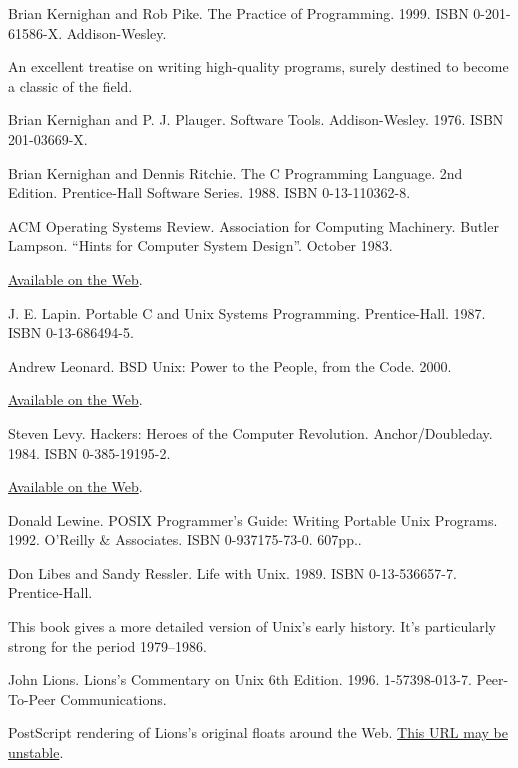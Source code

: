 \documentclass[12pt,oneside]{book}
\begin{document}
\begin{common-format}
\begin{thebibliography}{9}
 Brian Kernighan and Rob Pike. The Practice of Programming. 1999. ISBN 0-201-61586-X. Addison-Wesley.

An excellent treatise on writing high-quality programs, surely destined to become a classic of the field.

 Brian Kernighan and P. J. Plauger. Software Tools. Addison-Wesley. 1976. ISBN 201-03669-X.

 Brian Kernighan and Dennis Ritchie. The C Programming Language. 2nd Edition. Prentice-Hall Software Series. 1988. ISBN 0-13-110362-8.

 ACM Operating Systems Review. Association for Computing Machinery. Butler Lampson. “Hints for Computer System Design”. October 1983.

\href{http://research.microsoft.com/~lampson/33-Hints/WebPage.html}{Available on the Web}.

 J. E. Lapin. Portable C and Unix Systems Programming. Prentice-Hall. 1987. ISBN 0-13-686494-5.

 Andrew Leonard. BSD Unix: Power to the People, from the Code. 2000.

\href{http://dir.salon.com/tech/fsp/2000/05/16/chapter_2_part_one/index.html}{Available on the Web}.

 Steven Levy. Hackers: Heroes of the Computer Revolution. Anchor/Doubleday. 1984. ISBN 0-385-19195-2.

\href{http://www.stanford.edu/group/mmdd/SiliconValley/Levy/Hackers.1984.book/contents.html}{Available on the Web}.

 Donald Lewine. POSIX Programmer's Guide: Writing Portable Unix Programs. 1992. O'Reilly \&{} Associates. ISBN 0-937175-73-0. 607pp..

 Don Libes and Sandy Ressler. Life with Unix. 1989. ISBN 0-13-536657-7. Prentice-Hall.

This book gives a more detailed version of Unix's early history. It's particularly strong for the period 1979–1986.

 John Lions. Lions's Commentary on Unix 6th Edition. 1996. 1-57398-013-7. Peer-To-Peer Communications.

PostScript rendering of Lions's original floats around the Web. \href{http://www.upl.cs.wisc.edu/~epaulson/lionc.ps}{This URL may be unstable}.


\end{thebibliography}
\end{common-format}
\end{document}
